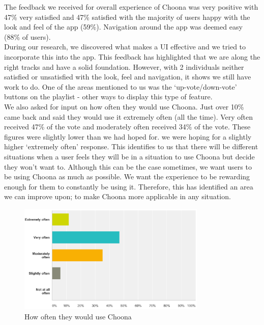 The feedback we received for overall experience of Choona was very positive with 47\% very satisfied and 47\% satisfied with the majority of users happy with the look and feel of the app (59\%).  Navigation around the app was deemed easy (88\% of users).  \\
During our research, we discovered what makes a UI effective and we tried to incorporate this into the app.  This feedback has highlighted that we are along the right tracks and have a solid foundation.  However, with 2 individuals neither satisfied or unsatisfied with the look, feel and navigation, it shows we still have work to do.  One of the areas mentioned to us was the `up-vote/down-vote' buttons on the playlist - other ways to display this type of feature.  \\

We also asked for input on how often they would use Choona.  Just over 10\% came back and said they would use it extremely often (all the time).  Very often received 47\% of the vote and moderately often received 34\% of the vote.  These figures were slightly lower than we had hoped for.  we were hoping for a slightly higher `extremely often' response.  This identifies to us that there will be different situations when a user feels they will be in a situation to use Choona but decide they won't want to.  Although this can be the case sometimes, we want users to be using Choona as much as possible.  We want the experience to be rewarding enough for them to constantly be using it.  Therefore, this has identified an area we can improve upon; to make Choona more applicable in any situation.  \\

    \begin{figure}[h!]
      \centering
      \includegraphics[width=0.8\textwidth]{./img/how_often.png}
      \caption{How often they would use Choona}
      \label{fig:how_often}
    \end{figure}

